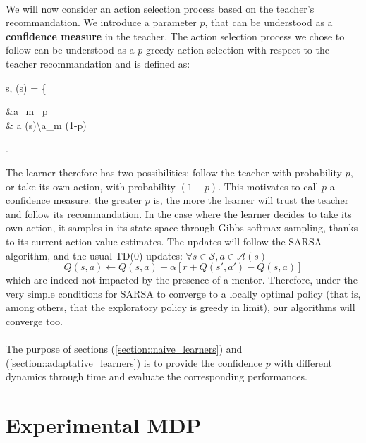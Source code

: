 \documentclass[a4paper]{report}
\begin{document}
{{			\paragraph{} We will now consider an action selection process based on the teacher's recommandation. We introduce a parameter $p$, that can be understood as a \textbf{confidence measure} in the teacher. The action selection process we chose to follow can be understood as a $p$-greedy action selection with respect to the teacher recommandation and is defined as: 
			{
				\forall s\in{}, \quad \pi(s) = \left\{
				\begin{aligned}
					&a_m \, p \\
					& a \in {}(s)\backslash a_m  (1-p)
				\end{aligned}\right.
				\label{eq::compliant_exploration}
			}
			The learner therefore has two possibilities: follow the teacher with probability $p$, or take its own action, with probability $(1-p)$. This motivates to call $p$ a confidence measure: the greater $p$ is, the more the learner will trust the teacher and follow its recommandation. In the case where the learner decides to take its own action, it samples in its state space through Gibbs softmax sampling, thanks to its current action-value estimates. \newline
			The updates will follow the SARSA algorithm, and the usual TD(0) updates: $\forall s\in\mathcal{S}, a\in\mathcal{A}(s)$
			\begin{equation}
				Q(s,a) \leftarrow Q(s,a) + \alpha \left[ r + Q(s',a') - Q(s,a) \right]
			\end{equation}
			which are indeed not impacted by the presence of a mentor. Therefore, under the very simple conditions for SARSA to converge to a locally optimal policy (that is, among others, that the exploratory policy is greedy in limit), our algorithms will converge too. 
			
			\paragraph{} The purpose of sections (\ref{section::naive_learners}) and (\ref{section::adaptative_learners}) is to provide the confidence $p$ with different dynamics through time and evaluate the corresponding performances. 
			
		}
		\section{Experimental MDP}
		{
}}
\end{document}
